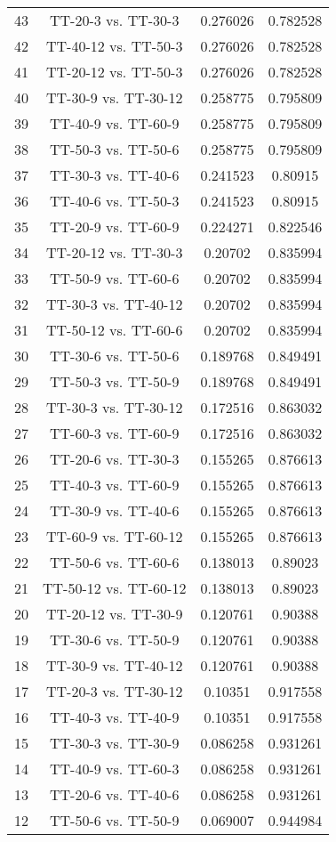 \documentclass[a4paper,10pt]{article}
\begin{document}
\begin{landscape}
\begin{table}[!htp]
\begin{tabular}{cccc}
43&TT-20-3 vs. TT-30-3&0.276026&0.782528\\
42&TT-40-12 vs. TT-50-3&0.276026&0.782528\\
41&TT-20-12 vs. TT-50-3&0.276026&0.782528\\
40&TT-30-9 vs. TT-30-12&0.258775&0.795809\\
39&TT-40-9 vs. TT-60-9&0.258775&0.795809\\
38&TT-50-3 vs. TT-50-6&0.258775&0.795809\\
37&TT-30-3 vs. TT-40-6&0.241523&0.80915\\
36&TT-40-6 vs. TT-50-3&0.241523&0.80915\\
35&TT-20-9 vs. TT-60-9&0.224271&0.822546\\
34&TT-20-12 vs. TT-30-3&0.20702&0.835994\\
33&TT-50-9 vs. TT-60-6&0.20702&0.835994\\
32&TT-30-3 vs. TT-40-12&0.20702&0.835994\\
31&TT-50-12 vs. TT-60-6&0.20702&0.835994\\
30&TT-30-6 vs. TT-50-6&0.189768&0.849491\\
29&TT-50-3 vs. TT-50-9&0.189768&0.849491\\
28&TT-30-3 vs. TT-30-12&0.172516&0.863032\\
27&TT-60-3 vs. TT-60-9&0.172516&0.863032\\
26&TT-20-6 vs. TT-30-3&0.155265&0.876613\\
25&TT-40-3 vs. TT-60-9&0.155265&0.876613\\
24&TT-30-9 vs. TT-40-6&0.155265&0.876613\\
23&TT-60-9 vs. TT-60-12&0.155265&0.876613\\
22&TT-50-6 vs. TT-60-6&0.138013&0.89023\\
21&TT-50-12 vs. TT-60-12&0.138013&0.89023\\
20&TT-20-12 vs. TT-30-9&0.120761&0.90388\\
19&TT-30-6 vs. TT-50-9&0.120761&0.90388\\
18&TT-30-9 vs. TT-40-12&0.120761&0.90388\\
17&TT-20-3 vs. TT-30-12&0.10351&0.917558\\
16&TT-40-3 vs. TT-40-9&0.10351&0.917558\\
15&TT-30-3 vs. TT-30-9&0.086258&0.931261\\
14&TT-40-9 vs. TT-60-3&0.086258&0.931261\\
13&TT-20-6 vs. TT-40-6&0.086258&0.931261\\
12&TT-50-6 vs. TT-50-9&0.069007&0.944984\\

\end{tabular}
\end{table}
\end{landscape}
\end{document}
